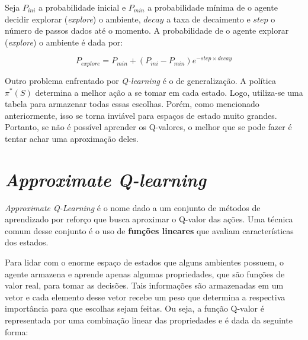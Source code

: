 Seja $P_{ini}$ a probabilidade inicial e $P_{min}$ a probabilidade mínima de o agente decidir explorar (\textit{explore}) o ambiente, $decay$ a taxa de decaimento e $step$ o número de passos dados até o momento.
A probabilidade de o agente explorar (\textit{explore}) o ambiente é dada por:

\begin{equation} \label{eq:exp_exp_prob}
P_{explore} = P_{min} + (P_{ini} - P_{min})e^{-step \times decay}
\end{equation}

Outro problema enfrentado por \textit{Q-learning} é o de generalização.
A política $\pi^{*}(S)$ determina a melhor ação a se tomar em cada estado.
Logo, utiliza-se uma tabela para armazenar todas essas escolhas.
Porém, como mencionado anteriormente, isso se torna inviável para espaços de estado muito grandes.
Portanto, se não é possível aprender os Q-valores, o melhor que se pode fazer é tentar achar uma aproximação deles.


\section{\textit{Approximate Q-learning}}
\label{sec:aql}

\textit{Approximate Q-Learning} é o nome dado a um conjunto de métodos de aprendizado por reforço que busca aproximar o Q-valor das ações.
Uma técnica comum desse conjunto é o uso de \textbf{funções lineares} que avaliam características dos estados.

Para lidar com o enorme espaço de estados que alguns ambientes possuem, o agente armazena e aprende apenas algumas propriedades, que são funções de valor real, para tomar as decisões.
Tais informações são armazenadas em um vetor e cada elemento desse vetor recebe um peso que determina a respectiva importância para que escolhas sejam feitas. Ou seja, a função Q-valor é representada por uma combinação linear das propriedades e é dada da seguinte forma:

